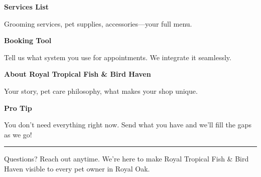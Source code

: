\documentclass[11pt,letterpaper]{article}
\begin{document}
\hfill
\begin{minipage}[t]{0.48\textwidth}
\begin{tcolorbox}[colframe=accent-teal, boxrule=1pt, left=0.7em, right=0.7em, top=0.5em, bottom=0.5em, arc=4pt, boxsep=0pt]
{\bfseries\small\color{accent-teal}Services List}

\vspace{0.15em}

{\small Grooming services, pet supplies, accessories—your full menu.}
\end{tcolorbox}

\vspace{0.1em}

\begin{tcolorbox}[colframe=accent-teal, boxrule=1pt, left=0.7em, right=0.7em, top=0.5em, bottom=0.5em, arc=4pt, boxsep=0pt]
{\bfseries\small\color{accent-teal}Booking Tool}

\vspace{0.15em}

{\small Tell us what system you use for appointments. We integrate it seamlessly.}
\end{tcolorbox}

\vspace{0.1em}

\begin{tcolorbox}[colframe=accent-teal, boxrule=1pt, left=0.7em, right=0.7em, top=0.5em, bottom=0.5em, arc=4pt, boxsep=0pt]
{\bfseries\small\color{accent-teal}About Royal Tropical Fish \& Bird Haven}

\vspace{0.15em}

{\small Your story, pet care philosophy, what makes your shop unique.}
\end{tcolorbox}

\vspace{0.1em}
\end{minipage}

\vspace{0.15em}

\begin{tcolorbox}[colback={accent-red!5}, colframe=accent-red!20, boxrule=0.5pt, left=0.7em, right=0.7em, top=0.4em, bottom=0.4em, arc=6pt, boxsep=0pt]

{\bfseries\small\color{accent-red}Pro Tip}

\vspace{0.1em}

{\small You don't need everything right now. Send what you have and we'll fill the gaps as we go!}

\end{tcolorbox}

\vspace{0.15em}

\noindent\hrule
\vspace{0.2em}

{\small\color{text-light}Questions? Reach out anytime. We're here to make Royal Tropical Fish \& Bird Haven visible to every pet owner in Royal Oak.}
\end{document}
